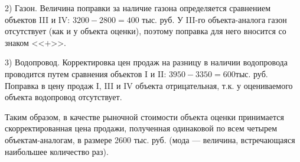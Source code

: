 2) Газон.
Величина поправки за наличие газона определяется сравнением объектов III и IV: $ 3200 - 2800 = 400 $ тыс. руб.
У III-го объекта-аналога газон отсутствует (как и у объекта оценки), поэтому поправка для него вносится со знаком  <<$+$>>.

3) Водопровод.
Корректировка цен продаж на разницу в наличии водопровода проводится путем сравнения объектов I и II: $ 3950 - 3350 = 600  $тыс. руб.
Поправка в цену продаж I, III и IV объекта отрицательная, т.к. у оцениваемого объекта водопровод отсутствует.

Таким образом, в качестве рыночной стоимости объекта оценки принимается скорректированная цена продажи, полученная одинаковой по всем четырем объектам-аналогам, в размере 2600 тыс. руб. (мода --- величина, встречающаяся наибольшее количество раз).

